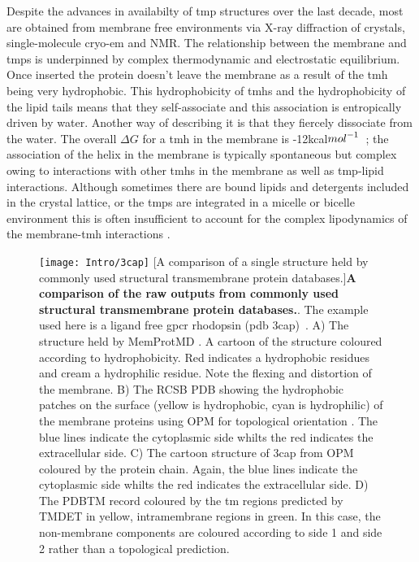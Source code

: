 Despite the advances in availabilty of \gls{tmp} structures over the last decade, most are obtained from membrane free environments via X\--ray diffraction of crystals, single\--molecule cryo\--\gls{em} and NMR.
The relationship between the membrane and \gls{tmp}s is underpinned by complex thermodynamic and  electrostatic equilibrium.
Once inserted the protein doesn't leave the membrane as a result of the \gls{tmh} being very hydrophobic.
This hydrophobicity of \gls{tmh}s and the hydrophobicity of the lipid tails means that they self-associate and this association is entropically driven by water.
Another way of describing it is that they fiercely dissociate from the water.
The overall $\Delta G$ for a \gls{tmh} in the membrane is -12kcal${mol}^{\--1}$~\cite{Cymer2015}; the association of the helix in the membrane is typically spontaneous but complex owing to interactions with other \gls{tmh}s in the membrane as well as \gls{tmp}\--lipid interactions.
Although sometimes there are bound lipids and detergents included in the crystal lattice, or the \gls{tmp}s are integrated in a micelle or bicelle environment this is often insufficient to account for the complex lipodynamics of the membrane\--\gls{tmh} interactions \cite{Coskun2011, Stansfeld2015}.

\begin{figure}[ht!]
\centering
\texttt{[image: Intro/3cap]}
		[A comparison of a single structure held by commonly used structural transmembrane protein databases.]{\textbf{A comparison of the raw outputs from commonly used structural transmembrane protein databases.}.
		The example used here is a ligand free \gls{gpcr} rhodopsin (\gls{pdb} 3cap)~\cite{Park2008}.
		A) The structure held by MemProtMD \cite{Stansfeld2015}. A cartoon of the structure coloured according to hydrophobicity. Red indicates a hydrophobic residues and cream a hydrophilic residue. Note the flexing and distortion of the membrane.
		B) The RCSB PDB \cite{Berman2000} showing the hydrophobic patches on the surface (yellow is hydrophobic, cyan is hydrophilic) of the membrane proteins using OPM for topological orientation \cite{Lomize2012}.
		The blue lines indicate the cytoplasmic side whilts the red indicates the extracellular side.
		C) The cartoon structure of 3cap from OPM \cite{Lomize2012} coloured by the protein chain.
		Again, the blue lines indicate the cytoplasmic side whilts the red indicates the extracellular side.
		D) The PDBTM \cite{Kozma2012} record coloured by the \gls{tm} regions predicted by TMDET \cite{Tusnady2005} in yellow, intramembrane regions in green.
		In this case, the non\--membrane components are coloured according to side 1 and side 2 rather than a topological prediction.
		}

\label{fig:3cap}
\end{figure}

